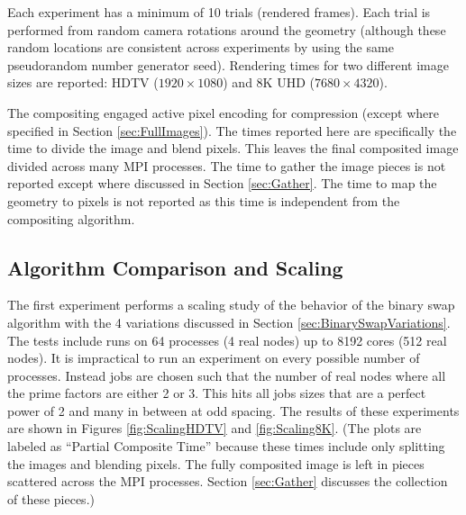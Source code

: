 \documentclass{vgtc}                          %
\newcommand{\textalgorithm}[1]{\textsf{#1}\xspace}
\newcommand{\binaryswap}{\textalgorithm{binary swap}}
\begin{document}
Each experiment has a minimum of 10 trials (rendered frames).
Each trial is performed from random camera rotations around the geometry (although these random locations are consistent across experiments by using the same pseudorandom number generator seed).
Rendering times for two different image sizes are reported: HDTV ($1920 \times 1080$) and 8K UHD ($7680 \times 4320$).

The compositing engaged active pixel encoding for compression (except where specified in Section \ref{sec:FullImages}).
The times reported here are specifically the time to divide the image and blend pixels.
This leaves the final composited image divided across many MPI processes.
The time to gather the image pieces is not reported except where discussed in Section \ref{sec:Gather}.
The time to map the geometry to pixels is not reported as this time is independent from the compositing algorithm.

\subsection{Algorithm Comparison and Scaling}
\label{sec:Scaling}

The first experiment performs a scaling study of the behavior of the \binaryswap algorithm with the 4 variations discussed in Section \ref{sec:BinarySwapVariations}.
The tests include runs on 64 processes (4 real nodes) up to 8192 cores (512 real nodes).
It is impractical to run an experiment on every possible number of processes.
Instead jobs are chosen such that the number of real nodes where all the prime factors are either 2 or 3.
This hits all jobs sizes that are a perfect power of 2 and many in between at odd spacing.
The results of these experiments are shown in Figures \ref{fig:ScalingHDTV} and \ref{fig:Scaling8K}.
(The plots are labeled as ``Partial Composite Time'' because these times include only splitting the images and blending pixels.
The fully composited image is left in pieces scattered across the MPI processes.
Section \ref{sec:Gather} discusses the collection of these pieces.)
\end{document}

